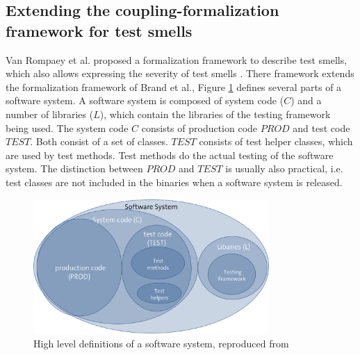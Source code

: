 \documentclass{uvamscse}
\newcommand{\AsigTS}{Van Rompaey et al.}
\begin{document}
\subsection{Extending the coupling-formalization framework for test smells}

\AsigTS{} proposed a formalization framework to describe test smells, which also allows expressing the severity of test smells \cite{van2006characterizing}. There framework extends the formalization framework of Brand et al.,  Figure \ref{fig:ssOverview} defines several parts of a software system. A software system is composed of system code ($C$) and a number of libraries ($L$), which contain the libraries of the testing framework being used. The system code $C$ consists of production code $PROD$ and test code $TEST$. Both consist of a set of classes. $TEST$ consists of test helper classes, which are used by test methods. Test methods do the actual testing of the software system. The distinction between $PROD$ and $TEST$ is usually also practical, i.e. test classes are not included in the binaries when a software system is released. 
\begin{figure}[!ht]	
	\centering
	\includegraphics[width=0.8\textwidth]{figures/SoftwareSystemOverview.png}
	\caption{High level definitions of a software system, reproduced from \cite{van2006characterizing}}
	\label{fig:ssOverview}
\end{figure}
\end{document}
